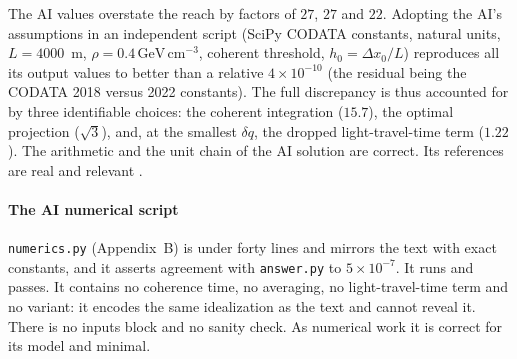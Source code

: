 The AI values overstate the reach by factors of $27$, $27$ and $22$. Adopting the AI's assumptions in an independent script (SciPy CODATA constants, natural units, $L=4000$~m, $\rho=0.4\,\mathrm{GeV\,cm^{-3}}$, coherent threshold, $h_0=\Delta x_0/L$) reproduces all its output values to better than a relative $4\times10^{-10}$ (the residual being the CODATA 2018 versus 2022 constants). The full discrepancy is thus accounted for by three identifiable choices: the coherent integration ($15.7$), the optimal projection ($\sqrt3$), and, at the smallest $\delta q$, the dropped light-travel-time term ($1.22$). The arithmetic and the unit chain of the AI solution are correct. Its references are real and relevant \citep{Guo2019}.

\paragraph*{The AI numerical script}
\texttt{numerics.py} (Appendix~B) is under forty lines and mirrors the text with exact constants, and it asserts agreement with \texttt{answer.py} to $5\times10^{-7}$. It runs and passes. It contains no coherence time, no averaging, no light-travel-time term and no variant: it encodes the same idealization as the text and cannot reveal it. There is no inputs block and no sanity check. As numerical work it is correct for its model and minimal.

